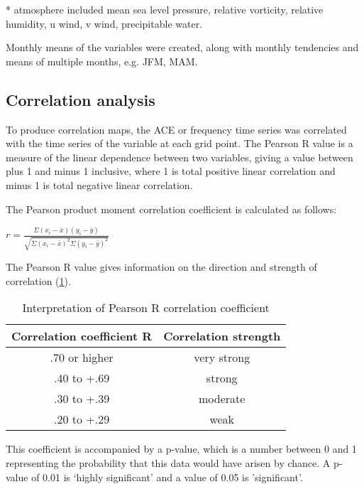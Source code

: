 * atmosphere included mean sea level pressure, relative vorticity, relative humidity, u wind, v wind, precipitable water.

Monthly means of the variables were created, along with monthly tendencies and means of multiple months, e.g. JFM, MAM.


\subsection{Correlation analysis}

To produce correlation maps, the ACE or frequency time series was correlated with the time series of the variable at each grid point. The Pearson R value is a measure of the linear dependence between two variables, giving a value between plus 1 and minus 1 inclusive, where 1 is total positive linear correlation and minus 1 is total negative linear correlation.

The Pearson product moment correlation coefficient is calculated as follows:

$r = \frac{\Sigma(x_i - \bar{x})(y_i - \bar{y})}{\sqrt{\Sigma(x_i - \bar{x})^2\Sigma(y_i - \bar{y})^2}}$

The Pearson R value gives information on the direction and strength of correlation (\ref{tcorrs}). %

\begin{table} %
	\caption{Interpretation of Pearson R correlation coefficient}\label{tcorrs}
	\begin{center}
		\begin{tabular}{cc}
			\hline\hline
			Correlation coefficient R & Correlation strength \\
			\hline
			.70 or higher & very strong  \\ 
			.40 to +.69 & strong \\ 
			.30 to +.39 & moderate  \\
			.20 to +.29 & weak \\
			
			\hline
		\end{tabular}
	\end{center}
\end{table}


This coefficient is accompanied by a p-value, which is a number between 0 and 1 representing the probability that this data would have arisen by chance. A p-value of 0.01 is ‘highly significant’ and a value of 0.05 is 'significant'.

